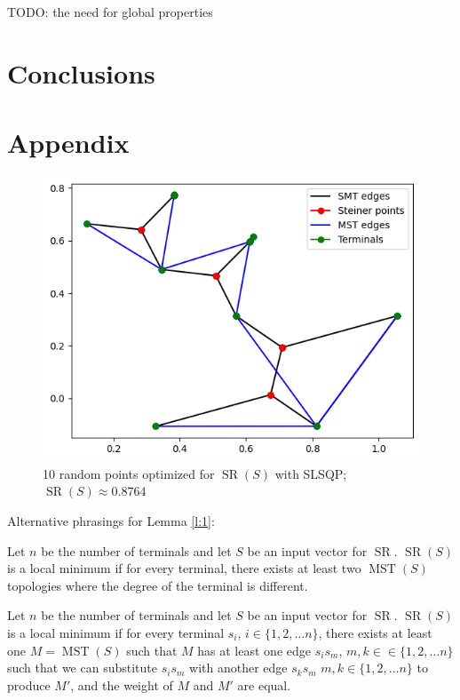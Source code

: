 \documentclass{mpaper}
\begin{document}
TODO: the need for global properties

\section{Conclusions}






\section{Appendix}

\begin{figure}[h!]
  \begin{center}
  \includegraphics[scale=0.5]{plot8764.png}
  \end{center}
  \caption{\label{fig:9}10 random points optimized for $\operatorname{SR}(S)$ with SLSQP; $\operatorname{SR}(S)\approx 0.8764$}
\end{figure}

Alternative phrasings for Lemma \ref{l:1}:

\begin{lemma}
  Let $n$ be the number of terminals and let $S$ be an input vector for $\operatorname{SR}$. $\operatorname{SR}(S)$ is a local minimum if for every terminal, there exists at least two $\operatorname{MST}(S)$ topologies where the degree of the terminal is different.
\end{lemma}
\begin{lemma}
  Let $n$ be the number of terminals and let $S$ be an input vector for $\operatorname{SR}$. $\operatorname{SR}(S)$ is a local minimum if for every terminal $s_i$, $i\in\{1,2,\dots n\}$, there exists at least one $M=\operatorname{MST}(S)$ such that $M$ has at least one edge $s_is_m$, $m, k\in \in\{1,2,\dots n\}$ such that we can substitute $s_is_m$ with another edge $s_ks_m$  $m, k\in\{1,2,\dots n\}$ to produce $M'$, and the weight of $M$ and $M'$ are equal.
\end{lemma}
\end{document}
